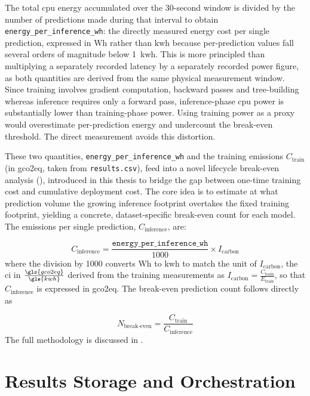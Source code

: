 The total \gls{cpu} energy accumulated over the 30-second window is divided by the number of predictions made during that interval to obtain \texttt{energy\_per\_inference\_wh}: the directly measured energy cost per single prediction, expressed in Wh rather than \gls{kwh} because per-prediction values fall several orders of magnitude below 1~\gls{kwh}. This is more principled than multiplying a separately recorded latency by a separately recorded power figure, as both quantities are derived from the same physical measurement window. Since training involves gradient computation, backward passes and tree-building whereas inference requires only a forward pass, inference-phase \gls{cpu} power is substantially lower than training-phase power. Using training power as a proxy would overestimate per-prediction energy and undercount the break-even threshold. The direct measurement avoids this distortion.

These two quantities, \texttt{energy\_per\_inference\_wh} and the training emissions $C_{\text{train}}$ (in \gls{gco2eq}, taken from \texttt{results.csv}), feed into a novel lifecycle break-even analysis (), introduced in this thesis to bridge the gap between one-time training cost and cumulative deployment cost. The core idea is to estimate at what prediction volume the growing inference footprint overtakes the fixed training footprint, yielding a concrete, dataset-specific break-even count for each model. The emissions per single prediction, $C_{\text{inference}}$, are:

\begin{equation}
C_{\text{inference}} = \frac{\texttt{energy\_per\_inference\_wh}}{1000} \times I_{\text{carbon}}
\label{eq:co2_per_inference}
\end{equation}
where the division by 1000 converts Wh to \gls{kwh} to match the unit of $I_{\text{carbon}}$, the \gls{ci} in $\frac{\gls{gco2eq}}{\gls{kwh}}$ derived from the training measurements as $I_{\text{carbon}} = \frac{C_{\text{train}}}{E_{\text{train}}}$, so that $C_{\text{inference}}$ is expressed in \gls{gco2eq}.
The break-even prediction count follows directly as

\begin{equation}
  \label{eq:N_Breakeven}
  N_{\text{break-even}} = \frac{C_{\text{train}}}{C_{\text{inference}}}
\end{equation}
The full methodology is discussed in .

\section{Results Storage and Orchestration}
\label{implementation_results}

